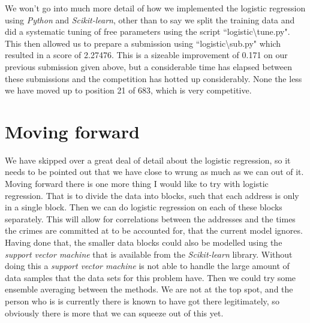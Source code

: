 \documentclass[12pt,notitlepage]{article}
\begin{document}
	We won't go into much more detail of how we implemented the logistic regression using \emph{Python} and \emph{Scikit-learn}, other than to say we split the training data and did a systematic tuning of free parameters using the script ``logistic\textbackslash tune.py". This then allowed us to prepare a submission using ``logistic\textbackslash sub.py" which resulted in a score of 2.27476. This is a sizeable improvement of 0.171 on our previous submission given above, but a considerable time has elapsed between these submissions and the competition has hotted up considerably. None the less we have moved up to position 21 of 683, which is very competitive.

\section{Moving forward}

We have skipped over a great deal of detail about the logistic regression, so it needs to be pointed out that we have close to wrung as much as we can out of it. Moving forward there is one more thing I would like to try with logistic regression. That is to divide the data into blocks, such that each address is only in a single block. Then we can do logistic regression on each of these blocks separately. This will allow for correlations between the addresses and the times the crimes are committed at to be accounted for, that the current model ignores. Having done that, the smaller data blocks could also be modelled using the \emph{support vector machine} that is available from the \emph{Scikit-learn} library. Without doing this a \emph{support vector machine} is not able to handle the large amount of data samples that the data sets for this problem have. Then we could try some ensemble averaging between the methods. We are not at the top spot, and the person who is is currently there is known to have got there legitimately, so obviously there is more that we can squeeze out of this yet.

\end{document}
